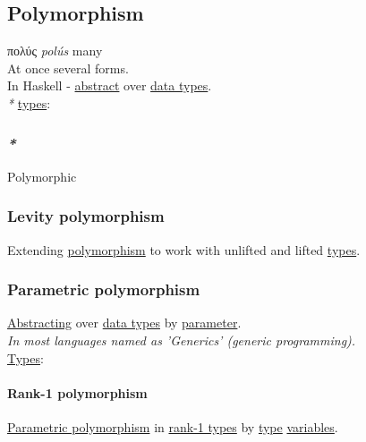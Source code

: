 \documentclass[11pt]{article}
\begin{document}
\subsection{\label{org64df340}Polymorphism}
\label{sec:orgc435f76}
πολύς \emph{polús} many\\

At once several forms.\\

In Haskell - \hyperref[orgbbe9132]{abstract} over \hyperref[org5c444ae]{data types}.\\

\emph{*} \hyperref[org4209edd]{types}:\\

\subsubsection{\emph{*}}
\label{sec:org324ee17}

\label{orgac4d581}Polymorphic\\

\subsubsection{\label{org3df4dcd}Levity polymorphism}
\label{sec:orgd4c58cb}
Extending \hyperref[org64df340]{polymorphism} to work with unlifted and lifted \hyperref[org4209edd]{types}.\\

\subsubsection{\label{org3c0b242}Parametric polymorphism}
\label{sec:org4518f2c}
\hyperref[org953d445]{Abstracting} over \hyperref[org5c444ae]{data types} by \hyperref[org0e7674e]{parameter}.\\

\emph{In most languages named as 'Generics' (generic programming).}\\

\hyperref[org4209edd]{Types}:\\

\paragraph{\label{org4a3d7d8}Rank-1 polymorphism}
\label{sec:org2da52b5}
\hyperref[org3c0b242]{Parametric polymorphism} in \hyperref[org49e3bd9]{rank-1 types} by \hyperref[orgc4aea2f]{type} \hyperref[orge17f54f]{variables}.\\
\end{document}
